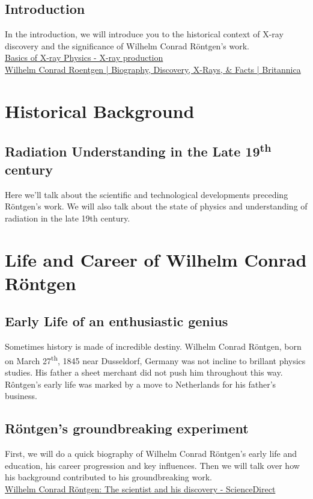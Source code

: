 \documentclass[a4paper,12pt]{report}
\begin{document}
\tableofcontents
{}

\newpage
\section*{Introduction}
In the introduction, we will introduce you to the historical context of X-ray discovery and 
the significance of Wilhelm Conrad Röntgen's work. ~\\


\href{https://radiologymasterclass.co.uk}{Basics of X-ray Physics - X-ray production}\\ 

\href{https://www.britannica.com/biography/Wilhelm-Rontgen}{Wilhelm Conrad Roentgen | Biography, Discovery, X-Rays, \& Facts | Britannica }

\chapter{Historical Background}
\section{Radiation Understanding in the Late 19\textsuperscript{th} century}
  Here we’ll talk about the scientific and technological developments preceding Röntgen's work. We will also talk about the state of physics and understanding of radiation in the late 19th century. 

\chapter{Life and Career of Wilhelm Conrad Röntgen}
\section{Early Life of an enthusiastic genius}
Sometimes history is made of incredible destiny. Wilhelm Conrad Röntgen, born on March 27\textsuperscript{th}, 1845 near Dusseldorf, Germany was not incline to brillant physics studies. 
His father a sheet merchant did not push him throughout this way. Rôntgen's early life was marked by a move to Netherlands for his father's business.
\section{Röntgen's groundbreaking experiment}
First, we will do a quick biography of Wilhelm Conrad Röntgen's early life and education, his career progression and key influences. Then we will talk over how his background contributed to his groundbreaking work.\\
\href{https://www.sciencedirect.com/science/article/pii/S1120179720302532}{Wilhelm Conrad Röntgen: The scientist and his discovery - ScienceDirect }
\end{document}
